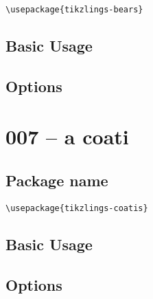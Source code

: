 \documentclass[parskip=half]{scrartcl}
\begin{document}
\begin{tcolorbox}
\vspace*{0.5cm}
\lstinline|\usepackage{tikzlings-bears}|
\vspace*{0.5cm}
\end{tcolorbox}

\subsection{Basic Usage}

\begin{tcblisting}{}
\bear
\end{tcblisting}

\subsection{Options}

\begin{tcblisting}{}
\bear[body=SteelBlue]
\end{tcblisting}

\begin{tcblisting}{}
\bear[3D]
\end{tcblisting}


\clearpage
\section{007 -- a coati}

\subsection{Package name}

\begin{tcolorbox}
\vspace*{0.5cm}
\lstinline|\usepackage{tikzlings-coatis}|
\vspace*{0.5cm}
\end{tcolorbox}

\subsection{Basic Usage}

\begin{tcblisting}{}
\coati
\end{tcblisting}

\subsection{Options}
\end{document}
